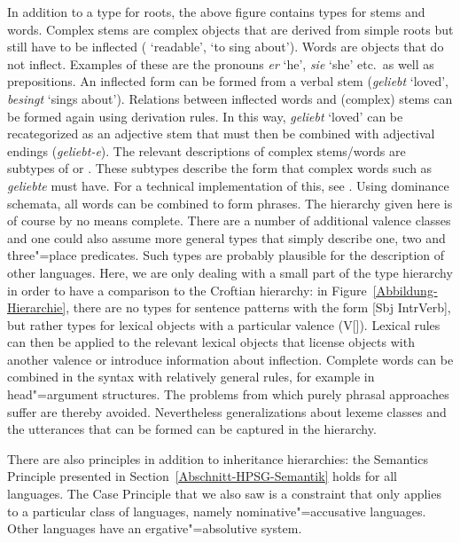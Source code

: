 \addlines
In addition to a type for roots, the above figure contains types for stems and words. Complex stems are complex objects that are
derived from simple roots but still have to be inflected ( `readable', 
`to sing about'). Words are objects that do not inflect. Examples of these
are the pronouns \emph{er} `he', \emph{sie} `she' etc.\ as well as prepositions. An inflected form can be formed from a verbal stem
(\emph{geliebt} `loved', \emph{besingt} `sings about'). Relations between inflected words and (complex) stems can be formed again using derivation rules. 
In this way, \emph{geliebt} `loved' can be recategorized as an adjective stem that must then be combined with adjectival endings (\emph{geliebt-e}).
The relevant descriptions of complex stems/words are subtypes of 
or . These subtypes describe the form that complex words such as \emph{geliebte} must have. For a technical implementation of this, see
. Using dominance schemata, all words can be combined to form phrases. The hierarchy given here is of course by no means complete.
There are a number of additional valence classes and one could also assume more general types that simply describe one, two and three"=place predicates. 
Such types are probably plausible for the description of other languages. Here, we are only dealing with a small part of the type hierarchy in order to have
a comparison to the Croftian hierarchy: in Figure~\ref{Abbildung-Hierarchie}, there are no types for
sentence patterns with the form
[Sbj IntrVerb], but rather types for lexical objects with a particular valence
(V[\comps {}]). Lexical rules can then be applied to the relevant lexical objects that license objects with another valence or introduce
information about inflection. Complete words can be combined in the syntax with relatively general rules, for example in head"=argument structures. The problems
from which purely phrasal approaches suffer are thereby avoided. Nevertheless generalizations about lexeme classes and the utterances that can be formed can be
captured in the hierarchy.

There are also principles in addition to inheritance hierarchies: the Semantics Principle presented in Section~\ref{Abschnitt-HPSG-Semantik} holds
for all languages. The Case Principle that we also saw is a constraint that only applies to a particular
class of languages, namely nominative"=accusative languages.
Other languages have an ergative"=absolutive system.

